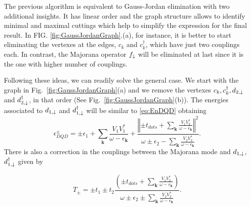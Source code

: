 \documentclass[showpacs,aps,prb,reprint,superscriptaddress]{revtex4-1}
\begin{document}
 
   
        
    
   
 
  


The previous algorithm is equivalent to Gauss-Jordan elimination with two additional insights. It has linear order and the graph structure allows to identify minimal and maximal cuttings which help to simplify the expression for the final result. In FIG. \ref{fig:GaussJordanGraph}.(a), for instance, it is better to start eliminating the vertexes at the edges, $c_k$ and $c_k^\dagger$, which have just two couplings each. In contrast, the Majorana operator $f_\downarrow$ will be eliminated at last since it is the one with higher number of couplings.  

Following these ideas, we can readily solve the general case.  We start with the graph in Fig.\ \ref{fig:GaussJordanGraph}(a) and we remove the vertexes $c_k,c^\dagger_k, d_{2,\downarrow}$ and $ d^\dagger_{2,\downarrow}$, in that order (See Fig.\ \ref{fig:GaussJordanGraph}(b)). The energies associated to $d_{1,\downarrow}$ and $d^\dagger_{1,\downarrow}$ will be similar to \eqref{eq:EnDQD} obtaining
\begin{equation}
    \epsilon_{DQD}^{\pm}=\pm\epsilon_{1}+\sum_{\mathbf{k}}\frac{V_{1}V_{1}^{*}}{\omega-\epsilon_{\mathbf{k}}}+\frac{\left\Vert \pm t_{dots}+\sum_{\mathbf{k}}\frac{V_{1}V_{2}^{*}}{\omega-\epsilon_{\mathbf{k}}}\right\Vert ^{2}}{\omega\pm\epsilon_{2}-\sum_{\mathbf{k}}\frac{V_{2}V_{2}^{*}}{\omega-\epsilon_{\mathbf{k}}}}. \label{eq:epDQD+-}
\end{equation}
\noindent There is also a correction in the couplings between the Majorana mode and $d_{1,\downarrow}$, $d^\dagger_{1,\downarrow}$ given by 

\begin{equation}
    T_{\pm}=\pm t_{1}\pm t_{2}\frac{\left(\pm t_{dots}+\sum_{\mathbf{k}}\frac{V_{1}V_{2}^{*}}{\omega-\epsilon_{\mathbf{k}}}\right)}{\omega\pm\epsilon_{2}\pm\sum_{\mathbf{k}}\frac{V_{2}V_{2}^{*}}{\omega-\epsilon_{\mathbf{k}}}}. \label{eq:T+-}
\end{equation}
\end{document}
